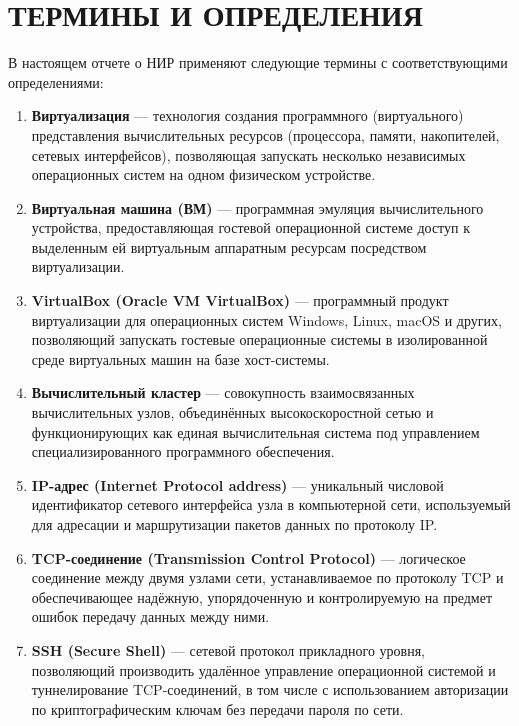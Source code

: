 \newpage
\section*{ТЕРМИНЫ И ОПРЕДЕЛЕНИЯ}
В настоящем отчете о НИР применяют следующие термины с соответствующими определениями:
\begin{enumerate}

\item \textbf{Виртуализация} --- технология создания программного
(виртуального) представления вычислительных ресурсов (процессора, памяти,
накопителей, сетевых интерфейсов), позволяющая запускать несколько
независимых операционных систем на одном физическом устройстве.

\item \textbf{Виртуальная машина (ВМ)} --- программная эмуляция
вычислительного устройства, предоставляющая гостевой операционной системе
доступ к выделенным ей виртуальным аппаратным ресурсам посредством
виртуализации.

\item \textbf{VirtualBox (Oracle VM VirtualBox)} --- программный продукт
виртуализации для операционных систем Windows, Linux, macOS и других,
позволяющий запускать гостевые операционные системы в изолированной среде
виртуальных машин на базе хост-системы.

\item \textbf{Вычислительный кластер} --- совокупность взаимосвязанных
вычислительных узлов, объединённых высокоскоростной сетью и
функционирующих как единая вычислительная система под управлением
специализированного программного обеспечения.

\item \textbf{IP-адрес (Internet Protocol address)} --- уникальный
числовой идентификатор сетевого интерфейса узла в компьютерной сети,
используемый для адресации и маршрутизации пакетов данных по протоколу IP.

\item \textbf{TCP-соединение (Transmission Control Protocol)} ---
логическое соединение между двумя узлами сети, устанавливаемое по
протоколу TCP и обеспечивающее надёжную, упорядоченную и контролируемую
на предмет ошибок передачу данных между ними.

\item \textbf{SSH (Secure Shell)} --- сетевой протокол прикладного уровня,
позволяющий производить удалённое управление операционной системой и
туннелирование TCP-соединений, в том числе с использованием авторизации по
криптографическим ключам без передачи пароля по сети.


\end{enumerate}
